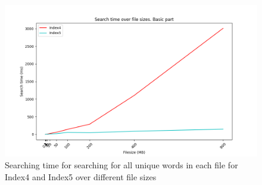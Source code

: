 \begin{figure}[H]
    \centering
    \includegraphics[width=.7\textwidth]{LaTeX/Pictures/Results/BPSearch[4, 5].png}
    \caption{Searching time for searching for all unique words in each file for Index4 and Index5 over different file sizes}
    \label{fig:BPsearch45}
\end{figure} 




